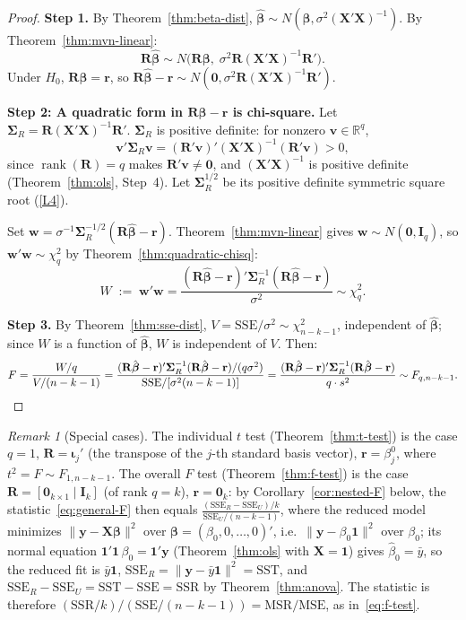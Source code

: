 \documentclass[14pt]{extarticle}
\theoremstyle{plain}
\theoremstyle{definition}
\theoremstyle{remark}
\newtheorem{remark}[theorem]{Remark}
\DeclareMathOperator\rank{rank}
\newcommand{\SST}{\mathrm{SST}}
\newcommand{\SSR}{\mathrm{SSR}}
\newcommand{\SSE}{\mathrm{SSE}}
\newcommand{\MSR}{\mathrm{MSR}}
\newcommand{\MSE}{\mathrm{MSE}}
\newcommand{\bX}{\mathbf{X}}
\newcommand{\by}{\mathbf{y}}
\def\bb{\boldsymbol{\beta}}
\newcommand{\bI}{\mathbf{I}}
\newcommand{\bR}{\mathbf{R}}
\newcommand{\br}{\mathbf{r}}
\newcommand{\bone}{\mathbf{1}}
\newcommand{\bzero}{\mathbf{0}}
\newcommand{\bw}{\mathbf{w}}
\newcommand{\bv}{\mathbf{v}}
\newcommand{\Real}{\mathbb{R}}
\begin{document}
\begin{proof}
\textbf{Step 1.} By Theorem~\ref{thm:beta-dist}, $\hat{\bb} \sim N(\bb, \sigma^2(\bX'\bX)^{-1})$. By Theorem~\ref{thm:mvn-linear}:
\[
\bR\hat{\bb} \sim N\!\bigl(\bR\bb,\; \sigma^2\bR(\bX'\bX)^{-1}\bR'\bigr).
\]
Under $H_0$, $\bR\bb = \br$, so $\bR\hat{\bb} - \br \sim N(\bzero, \sigma^2\bR(\bX'\bX)^{-1}\bR')$.

\textbf{Step 2: A quadratic form in $\bR\hat{\bb} - \br$ is chi-square.} Let $\boldsymbol\Sigma_R = \bR(\bX'\bX)^{-1}\bR'$. $\boldsymbol\Sigma_R$ is positive definite: for nonzero $\bv \in \Real^q$,
\[
\bv'\boldsymbol\Sigma_R\bv = (\bR'\bv)'(\bX'\bX)^{-1}(\bR'\bv) > 0,
\]
since $\rank(\bR) = q$ makes $\bR'\bv \neq \bzero$, and $(\bX'\bX)^{-1}$ is positive definite (Theorem~\ref{thm:ols}, Step~4). Let $\boldsymbol\Sigma_R^{1/2}$ be its positive definite symmetric square root (\ref{L4}).

Set $\bw = \sigma^{-1}\boldsymbol\Sigma_R^{-1/2}(\bR\hat{\bb} - \br)$. Theorem~\ref{thm:mvn-linear} gives $\bw \sim N(\bzero, \bI_q)$, so $\bw'\bw \sim \chi^2_q$ by Theorem~\ref{thm:quadratic-chisq}:
\[
W \;:=\; \bw'\bw = \frac{(\bR\hat{\bb} - \br)'\boldsymbol\Sigma_R^{-1}(\bR\hat{\bb} - \br)}{\sigma^2} \sim \chi^2_q.
\]

\textbf{Step 3.} By Theorem~\ref{thm:sse-dist}, $V = \SSE/\sigma^2 \sim \chi^2_{n-k-1}$, independent of $\hat{\bb}$; since $W$ is a function of $\hat{\bb}$, $W$ is independent of $V$. Then:
\[
F = \frac{W/q}{V/(n-k-1)} = \frac{(\bR\hat{\bb} - \br)'\boldsymbol\Sigma_R^{-1}(\bR\hat{\bb} - \br)/(q\sigma^2)}{\SSE/[\sigma^2(n-k-1)]} = \frac{(\bR\hat{\bb} - \br)'\boldsymbol\Sigma_R^{-1}(\bR\hat{\bb} - \br)}{q \cdot s^2} \sim F_{q, n-k-1}. \qedhere
\]
\end{proof}

\begin{remark}[Special cases]\label{rem:special-cases}
The individual $t$ test (Theorem~\ref{thm:t-test}) is the case $q = 1$, $\bR = \boldsymbol\iota_j'$ (the transpose of the $j$-th standard basis vector), $\br = \beta_j^0$, where $t^2 = F \sim F_{1, n-k-1}$. The overall $F$ test (Theorem~\ref{thm:f-test}) is the case $\bR = [\bzero_{k \times 1} \mid \bI_k]$ (of rank $q = k$), $\br = \bzero_k$: by Corollary~\ref{cor:nested-F} below, the statistic~\eqref{eq:general-F} then equals $\frac{(\SSE_R - \SSE_U)/k}{\SSE_U/(n-k-1)}$, where the reduced model minimizes $\|\by - \bX\bb\|^2$ over $\bb = (\beta_0, 0, \ldots, 0)'$, i.e.\ $\|\by - \beta_0\bone\|^2$ over $\beta_0$; its normal equation $\bone'\bone\,\beta_0 = \bone'\by$ (Theorem~\ref{thm:ols} with $\bX = \bone$) gives $\hat{\beta}_0 = \bar{y}$, so the reduced fit is $\bar{y}\bone$, $\SSE_R = \|\by - \bar{y}\bone\|^2 = \SST$, and $\SSE_R - \SSE_U = \SST - \SSE = \SSR$ by Theorem~\ref{thm:anova}. The statistic is therefore $(\SSR/k)/(\SSE/(n-k-1)) = \MSR/\MSE$, as in~\eqref{eq:f-test}.
\end{remark}
\end{document}

